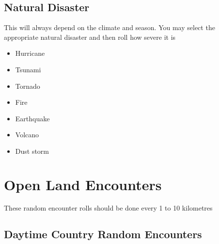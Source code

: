 \subsection{Natural Disaster}

This will always depend on the climate and season. You may select the appropriate natural disaster and then roll how severe it is

\begin{itemize}
    \item Hurricane
    \item Tsunami
    \item Tornado
    \item Fire
    \item Earthquake
    \item Volcano
    \item Dust storm
\end{itemize}

\section{Open Land Encounters}

These random encounter rolls should be done every 1 to 10 kilometres

\subsection{Daytime Country Random Encounters}

